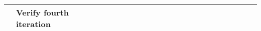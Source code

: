 \begin{table}[ht!]
\begin{tabular}{lp{2.5in}|llllllllllllllllllll|}
    \multicolumn{1}{|l|}{\cellcolor[HTML]{00E2FF}\textbf{}}                & \cellcolor[HTML]{00E2FF}\textbf{Verify fourth iteration}                   & \multicolumn{1}{l|}{}                                   & \multicolumn{1}{l|}{}                                   & \multicolumn{1}{l|}{}                                   & \multicolumn{1}{l|}{}                                   & \multicolumn{1}{l|}{}                                   & \multicolumn{1}{l|}{}                                   & \multicolumn{1}{l|}{}                                   & \multicolumn{1}{l|}{}                                   & \multicolumn{1}{l|}{}                                   & \multicolumn{1}{l|}{}                                    & \multicolumn{1}{l|}{}                                    & \multicolumn{1}{l|}{}                                    & \multicolumn{1}{l|}{}                                    & \multicolumn{1}{l|}{}                                    & \multicolumn{1}{l|}{}                                    & \multicolumn{1}{l|}{}                                    & \multicolumn{1}{l|}{\cellcolor[HTML]{F8A102}}            & \multicolumn{1}{l|}{}                                    & \multicolumn{1}{l|}{}                                    &             \\ \hline
    \end{tabular}
    \end{table}